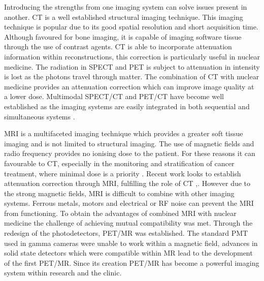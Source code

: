 Introducing the strengths from one imaging system can solve issues present in another. \acrlong{CT} is a well established structural imaging technique. This imaging technique is popular due to its good spatial resolution and short acquisition time. Although favoured for bone imaging, it is capable of imaging software tissue through the use of contrast agents. \acrshort{CT} is able to incorporate attenuation information within reconstructions, this correction is particularly useful in nuclear medicine. The radiation in \acrshort{SPECT} and \acrshort{PET} is subject to attenuation in intensity is lost as the photons travel through matter. The combination of \acrshort{CT} with nuclear medicine provides an attenuation correction which can improve image quality at a lower dose. Multimodal \acrshort{SPECT/CT} and \acrshort{PET/CT} have become well established as the imaging systems are easily integrated in both sequential and simultaneous systems \cite{Schillaci2005HybridImaging}.

\acrshort{MRI} is a multifaceted imaging technique which provides a greater soft tissue imaging and is not limited to structural imaging. The use of magnetic fields and radio frequency provides no ionising dose to the patient. For these reasons it can favourable to \acrshort{CT}, especially in the monitoring and stratification of cancer treatment, where minimal dose is a priority \cite{Cherry2009MultimodalitySPECT/CT}. Recent work looks to establish attenuation correction through \acrshort{MRI}, fulfilling the role of \acrshort{CT} \cite{Zaidi2007IsImaging},\cite{Hofmann2008MRI-basedRegistration}. However due to the strong magnetic fields, \acrshort{MRI} is difficult to combine with other imaging systems. Ferrous metals, motors and electrical or \acrshort{RF} noise can prevent the \acrshort{MRI} from functioning. To obtain the advantages of combined \acrshort{MRI} with nuclear medicine the challenge of achieving mutual compatibility was met. Through the redesign of the photodetectors, \acrshort{PET/MR} was established. The standard \acrshort{PMT} used in gamma cameras were unable to work within a magnetic field, advances in solid state detectors which were compatible within \acrshort{MR} lead to the development of the first \acrshort{PET/MR}. Since its creation \acrshort{PET/MR} has become a powerful imaging system within research and the clinic. 

